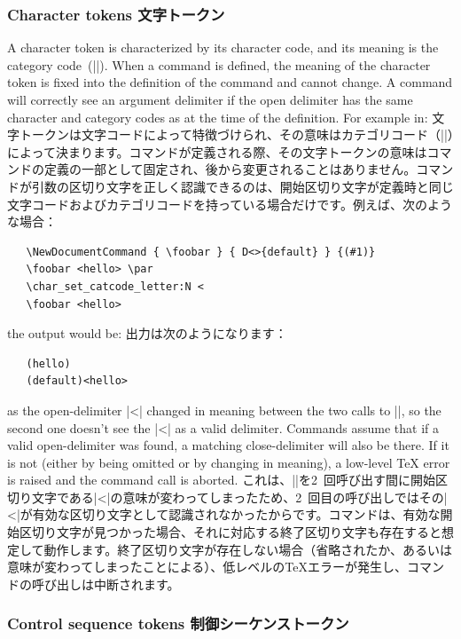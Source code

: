 \documentclass{ltxguide}
\newcommand\jpnewline{\vspace{3pt}\newline}
\begin{document}
\subsubsection{Character tokens
文字トークン}

A character token is characterized by its character code, and its meaning
is the category code~(|\catcode|).  When a command is defined, the meaning
of the character token is fixed into the definition of the command and
cannot change.  A command will correctly see an argument delimiter if
the open delimiter has the same character and category codes as at the
time of the definition.  For example in:
\jpnewline
文字トークンは文字コードによって特徴づけられ、その意味はカテゴリコード（|\catcode|）によって決まります。コマンドが定義される際、その文字トークンの意味はコマンドの定義の一部として固定され、後から変更されることはありません。コマンドが引数の区切り文字を正しく認識できるのは、開始区切り文字が定義時と同じ文字コードおよびカテゴリコードを持っている場合だけです。例えば、次のような場合：
\begin{verbatim}
   \NewDocumentCommand { \foobar } { D<>{default} } {(#1)}
   \foobar <hello> \par
   \char_set_catcode_letter:N <
   \foobar <hello>
\end{verbatim}
the output would be:
\jpnewline
出力は次のようになります：
\begin{verbatim}
   (hello)
   (default)<hello>
\end{verbatim}
as the open-delimiter |<| changed in meaning between the two calls to
|\foobar|, so the second one doesn't see the |<| as a valid delimiter.
Commands assume that if a valid open-delimiter was found, a matching
close-delimiter will also be there.  If it is not (either by being
omitted or by changing in meaning), a low-level \TeX{} error is raised
and the command call is aborted.
\jpnewline
これは、|\foobar|を2~回呼び出す間に開始区切り文字である|<|の意味が変わってしまったため、2~回目の呼び出しではその|<|が有効な区切り文字として認識されなかったからです。コマンドは、有効な開始区切り文字が見つかった場合、それに対応する終了区切り文字も存在すると想定して動作します。終了区切り文字が存在しない場合（省略されたか、あるいは意味が変わってしまったことによる）、低レベルの\TeX{}エラーが発生し、コマンドの呼び出しは中断されます。

\subsubsection{Control sequence tokens
制御シーケンストークン}
\end{document}

